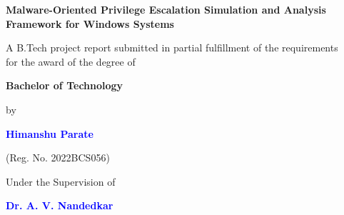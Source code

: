 
\thispagestyle{empty}
\singlespacing
\begin{titlepage}
\begin{center}
    \centering
     
      
  {{\Large \textbf{Malware-Oriented Privilege Escalation Simulation and Analysis Framework for Windows Systems}\par}}
    \vspace{1cm}%
     
    \vspace{1cm}
    {A B.Tech project report submitted in partial fulfillment of the requirements \\ for the award of the degree of \par}
    \vspace{0.1cm}
    {
    \textbf{\large Bachelor of Technology} \par}
    \vspace{0.3cm}


    {\large by\par}
    \vspace{0.1cm}
    {\large \textbf{\textcolor{blue}{Himanshu Parate}}\par} 
    (Reg. No. 2022BCS056)
    \vspace{0.4cm}
    
    {Under the Supervision of \par}
    {\large \textbf{\textbf{\textcolor{blue}{Dr. A. V. Nandedkar}}}\par}
     \vspace{0.8 cm}


\end{center}
\end{titlepage}
